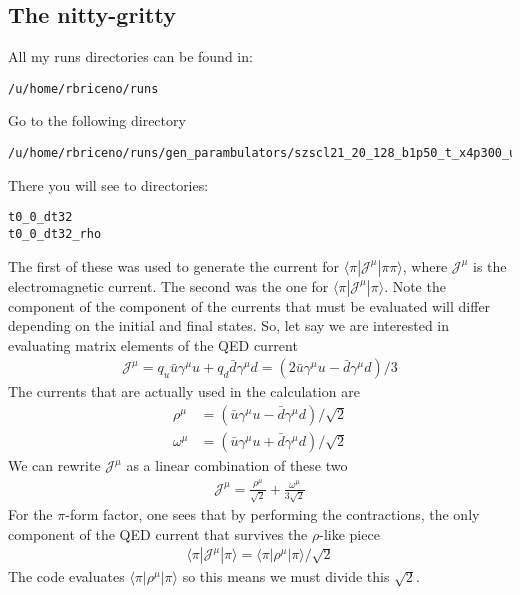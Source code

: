 \documentclass[prd,showpacs,showkeys,preprintnumbers,floatfix,
nofootinbib,superscriptaddress]{revtex4}
\begin{document}
\subsection{The nitty-gritty}
All my runs directories can be found in:
\footnotesize
\begin{verbatim}
/u/home/rbriceno/runs
\end{verbatim} 
\normalsize
Go to the following directory
\footnotesize
\begin{verbatim}
/u/home/rbriceno/runs/gen_parambulators/szscl21_20_128_b1p50_t_x4p300_um0p0840_sm0p0743_n1p265
\end{verbatim} 
\normalsize

There you will see to directories:
\footnotesize
\begin{verbatim}
t0_0_dt32  
t0_0_dt32_rho
\end{verbatim} 
\normalsize
The first of these was used to generate the current for $\langle\pi |\mathcal{J}^\mu|\pi\pi\rangle$, where $\mathcal{J}^\mu$ is the electromagnetic current. The second was the one for $\langle\pi |\mathcal{J}^\mu|\pi\rangle $. Note the component of the component of the currents that must be evaluated will differ depending on the initial and final states. So, let say we are interested in evaluating matrix elements of the QED current
\begin{align}
{\mathcal{J}}^{\mu}=q_u\bar{u}\gamma^\mu u+q_d\bar{d}\gamma^\mu d=(2\bar{u}\gamma^\mu u-\bar{d}\gamma^\mu d)/3
\end{align} 
The currents that are actually used in the calculation are 
\begin{align}
\rho^{\mu}&=(\bar{u}\gamma^\mu u-\bar{d}\gamma^\mu d)/\sqrt{2}\\
\omega^{\mu}&=(\bar{u}\gamma^\mu u+\bar{d}\gamma^\mu d)/\sqrt{2}
\end{align} 
We can rewrite ${\mathcal{J}}^{\mu}$ as a linear combination of these two
\begin{align}
{\mathcal{J}}^{\mu}=\frac{ \rho^{\mu}}{\sqrt{2}}+\frac{\omega^{\mu}}{3\sqrt{2}}
\end{align} 
For the $\pi$-form factor, one sees that by performing the contractions, the only component of the QED current that survives the $\rho$-like piece
\begin{align}
\langle\pi|{\mathcal{J}}^{\mu}|\pi\rangle=
\langle\pi|\rho^{\mu}|\pi\rangle/\sqrt{2}
\end{align}
The code evaluates $\langle\pi|\rho^{\mu}|\pi\rangle$ so this means we must divide this $\sqrt{2}$. 
\end{document}
